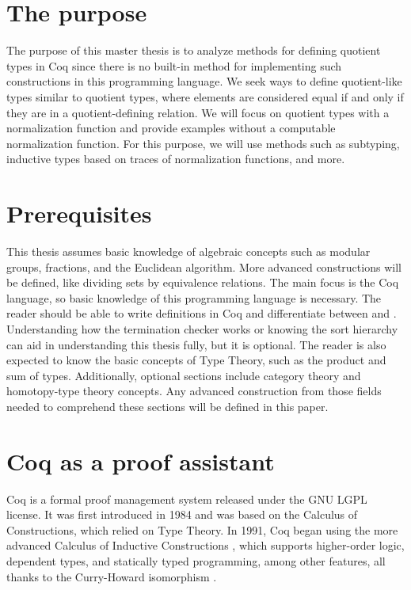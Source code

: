 \section{The purpose}
The purpose of this master thesis is to analyze methods for defining quotient types in Coq since there is no built-in method for implementing such constructions in this programming language. We seek ways to define quotient-like types similar to quotient types, where elements are considered equal if and only if they are in a quotient-defining relation. We will focus on quotient types with a normalization function and provide examples without a computable normalization function. For this purpose, we will use methods such as subtyping, inductive types based on traces of normalization functions, and more.

\section{Prerequisites}
This thesis assumes basic knowledge of algebraic concepts such as modular groups, fractions, and the Euclidean algorithm. More advanced constructions will be defined, like dividing sets by equivalence relations. The main focus is the Coq language, so basic knowledge of this programming language is necessary. The reader should be able to write definitions in Coq and differentiate between  and . Understanding how the termination checker works or knowing the sort hierarchy can aid in understanding this thesis fully, but it is optional. The reader is also expected to know the basic concepts of Type Theory, such as the product and sum of types. Additionally, optional sections include category theory and homotopy-type theory concepts. Any advanced construction from those fields needed to comprehend these sections will be defined in this paper.

\section{Coq as a proof assistant}
Coq is a formal proof management system released under the GNU LGPL license. It was first introduced in 1984 and was based on the Calculus of Constructions, which relied on Type Theory. In 1991, Coq began using the more advanced Calculus of Inductive Constructions \cite{coqDoc} \cite{cicOrigins}, which supports higher-order logic, dependent types, and statically typed programming, among other features, all thanks to the Curry-Howard isomorphism \cite{curry-howard}.

